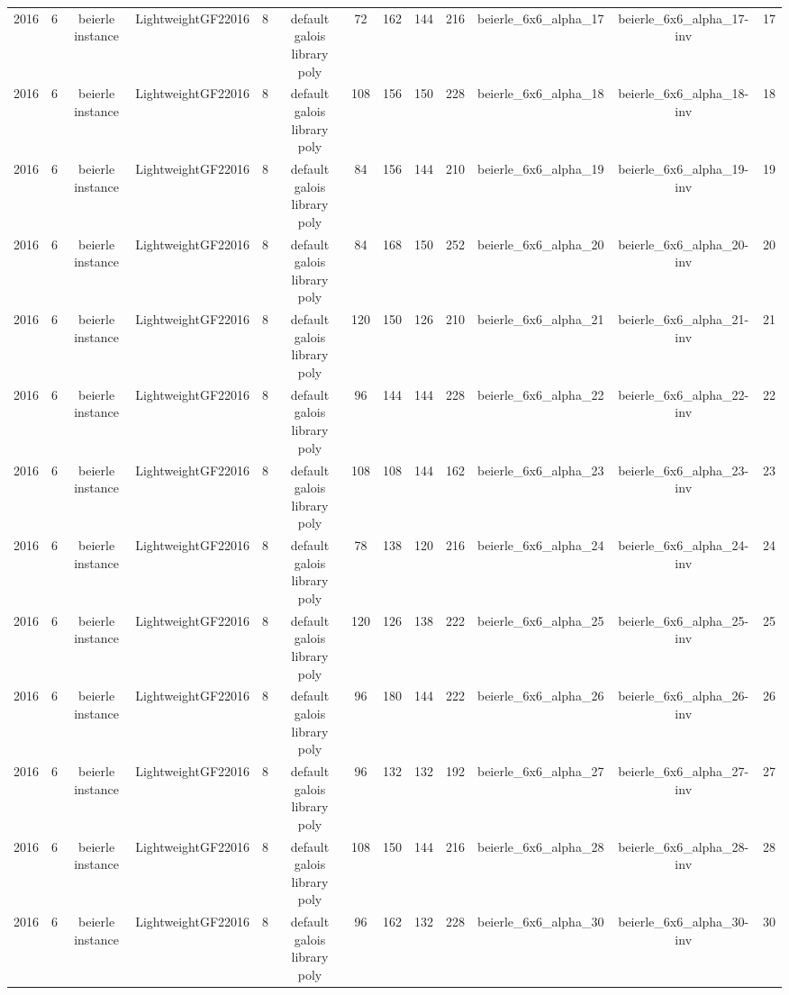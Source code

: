 \begin{tabular}{c c c c c c c c c c c c c}
2016 & 6 & beierle instance & LightweightGF22016 & 8 & default galois library poly & 72 & 162 & 144 & 216 & beierle_6x6_alpha_17 & beierle_6x6_alpha_17-inv & 17 \\
2016 & 6 & beierle instance & LightweightGF22016 & 8 & default galois library poly & 108 & 156 & 150 & 228 & beierle_6x6_alpha_18 & beierle_6x6_alpha_18-inv & 18 \\
2016 & 6 & beierle instance & LightweightGF22016 & 8 & default galois library poly & 84 & 156 & 144 & 210 & beierle_6x6_alpha_19 & beierle_6x6_alpha_19-inv & 19 \\
2016 & 6 & beierle instance & LightweightGF22016 & 8 & default galois library poly & 84 & 168 & 150 & 252 & beierle_6x6_alpha_20 & beierle_6x6_alpha_20-inv & 20 \\
2016 & 6 & beierle instance & LightweightGF22016 & 8 & default galois library poly & 120 & 150 & 126 & 210 & beierle_6x6_alpha_21 & beierle_6x6_alpha_21-inv & 21 \\
2016 & 6 & beierle instance & LightweightGF22016 & 8 & default galois library poly & 96 & 144 & 144 & 228 & beierle_6x6_alpha_22 & beierle_6x6_alpha_22-inv & 22 \\
2016 & 6 & beierle instance & LightweightGF22016 & 8 & default galois library poly & 108 & 108 & 144 & 162 & beierle_6x6_alpha_23 & beierle_6x6_alpha_23-inv & 23 \\
2016 & 6 & beierle instance & LightweightGF22016 & 8 & default galois library poly & 78 & 138 & 120 & 216 & beierle_6x6_alpha_24 & beierle_6x6_alpha_24-inv & 24 \\
2016 & 6 & beierle instance & LightweightGF22016 & 8 & default galois library poly & 120 & 126 & 138 & 222 & beierle_6x6_alpha_25 & beierle_6x6_alpha_25-inv & 25 \\
2016 & 6 & beierle instance & LightweightGF22016 & 8 & default galois library poly & 96 & 180 & 144 & 222 & beierle_6x6_alpha_26 & beierle_6x6_alpha_26-inv & 26 \\
2016 & 6 & beierle instance & LightweightGF22016 & 8 & default galois library poly & 96 & 132 & 132 & 192 & beierle_6x6_alpha_27 & beierle_6x6_alpha_27-inv & 27 \\
2016 & 6 & beierle instance & LightweightGF22016 & 8 & default galois library poly & 108 & 150 & 144 & 216 & beierle_6x6_alpha_28 & beierle_6x6_alpha_28-inv & 28 \\
2016 & 6 & beierle instance & LightweightGF22016 & 8 & default galois library poly & 96 & 162 & 132 & 228 & beierle_6x6_alpha_30 & beierle_6x6_alpha_30-inv & 30 \\

\end{tabular}
